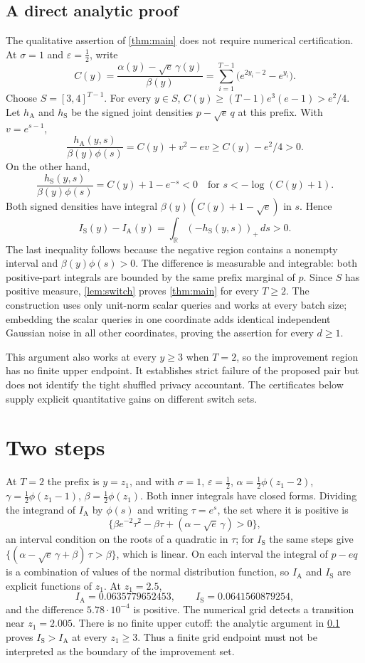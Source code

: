 \documentclass[11pt]{amsart}
\theoremstyle{definition}
\theoremstyle{remark}
\newcommand{\R}{\mathbb R}
\newcommand{\ANTI}{\mathrm{A}}
\newcommand{\SAME}{\mathrm{S}}
\begin{document}
\subsection{A direct analytic proof}\label{sec:analytic}
The qualitative assertion of \cref{thm:main} does not require numerical certification. At $\sigma=1$ and $\varepsilon=\frac12$, write
\[
C(y)=\frac{\alpha(y)-\sqrt e\,\gamma(y)}{\beta(y)}
=\sum_{i=1}^{T-1}\bigl(e^{2y_i-2}-e^{y_i}\bigr).
\]
Choose $S=[3,4]^{T-1}$. For every $y\in S$,
$C(y)\ge (T-1)e^3(e-1)>e^2/4$. Let $h_{\ANTI}$ and $h_{\SAME}$ be the signed joint densities $p-\sqrt e\,q$ at this prefix. With $v=e^{s-1}$,
\[
\frac{h_{\ANTI}(y,s)}{\beta(y)\phi(s)}
=C(y)+v^2-ev\ge C(y)-e^2/4>0.
\]
On the other hand,
\[
\frac{h_{\SAME}(y,s)}{\beta(y)\phi(s)}
=C(y)+1-e^{-s}<0
\quad\text{for }s<-\log(C(y)+1).
\]
Both signed densities have integral $\beta(y)(C(y)+1-\sqrt e)$ in $s$. Hence
\[
I_{\SAME}(y)-I_{\ANTI}(y)
=\int_{\R}(-h_{\SAME}(y,s))_+\,ds>0.
\]
The last inequality follows because the negative region contains a nonempty interval and $\beta(y)\phi(s)>0$. The difference is measurable and integrable: both positive-part integrals are bounded by the same prefix marginal of $p$. Since $S$ has positive measure, \cref{lem:switch} proves \cref{thm:main} for every $T\ge2$. The construction uses only unit-norm scalar queries and works at every batch size; embedding the scalar queries in one coordinate adds identical independent Gaussian noise in all other coordinates, proving the assertion for every $d\ge1$.

This argument also works at every $y\ge3$ when $T=2$, so the improvement region has no finite upper endpoint. It establishes strict failure of the proposed pair but does not identify the tight shuffled privacy accountant. The certificates below supply explicit quantitative gains on different switch sets.

\section{Two steps}\label{sec:T2}

At $T=2$ the prefix is $y=z_1$, and with $\sigma=1$, $\varepsilon=\frac12$, $\alpha=\frac12\phi(z_1-2)$, $\gamma=\frac12\phi(z_1-1)$, $\beta=\frac12\phi(z_1)$. Both inner integrals have closed forms. Dividing the integrand of $I_{\ANTI}$ by $\phi(s)$ and writing $\tau=e^{s}$, the set where it is positive is
\[
\{\beta e^{-2}\tau^2-\beta\tau+(\alpha-\sqrt e\,\gamma)>0\},
\]
an interval condition on the roots of a quadratic in $\tau$; for $I_{\SAME}$ the same steps give $\{(\alpha-\sqrt e\,\gamma+\beta)\,\tau>\beta\}$, which is linear. On each interval the integral of $p-e q$ is a combination of values of the normal distribution function, so $I_{\ANTI}$ and $I_{\SAME}$ are explicit functions of $z_1$. At $z_1=2.5$,
\[
I_{\ANTI}=0.0635779652453,\qquad I_{\SAME}=0.0641560879254,
\]
and the difference $5.78\cdot10^{-4}$ is positive. The numerical grid detects a transition near $z_1=2.005$. There is no finite upper cutoff: the analytic argument in \cref{sec:analytic} proves $I_{\SAME}>I_{\ANTI}$ at every $z_1\ge3$. Thus a finite grid endpoint must not be interpreted as the boundary of the improvement set.
\end{document}
